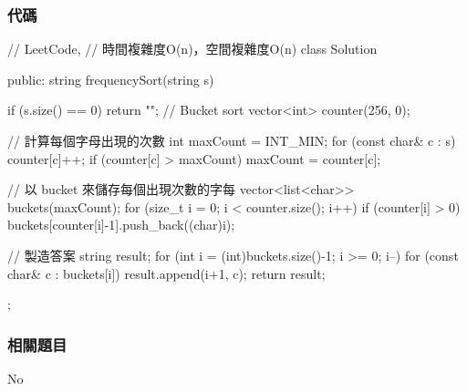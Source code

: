\subsubsection{代碼}
\begin{Code}
// LeetCode,
// 時間複雜度O(n)，空間複雜度O(n)
class Solution {
public:
    string frequencySort(string s) {
        if (s.size() == 0) return "";
        // Bucket sort
        vector<int> counter(256, 0);

        // 計算每個字母出現的次數
        int maxCount = INT_MIN;
        for (const char& c : s)
        {
            counter[c]++;
            if (counter[c] > maxCount)
                maxCount = counter[c];
        }

        // 以 bucket 來儲存每個出現次數的字每
        vector<list<char>> buckets(maxCount);
        for (size_t i = 0; i < counter.size(); i++)
        {
            if (counter[i] > 0)
                buckets[counter[i]-1].push_back((char)i);
        }

        // 製造答案
        string result;
        for (int i = (int)buckets.size()-1; i >= 0; i--)
        {
            for (const char& c : buckets[i])
                result.append(i+1, c);
        }
        return result;
    }
};
\end{Code}

\subsubsection{相關題目}
No
